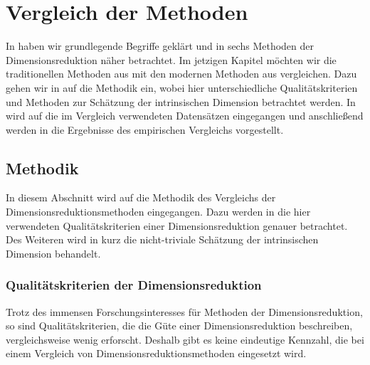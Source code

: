 \chapter{Vergleich der Methoden}
\label{ch:Vergleich}

In  haben wir grundlegende Begriffe geklärt und in
 sechs Methoden der Dimensionsreduktion näher betrachtet. Im jetzigen
Kapitel möchten wir die traditionellen Methoden aus  mit
den modernen Methoden aus  vergleichen. Dazu gehen wir in
 auf die Methodik ein, wobei hier unterschiedliche
Qualitätskriterien und Methoden zur Schätzung der intrinsischen Dimension betrachtet werden. In
 wird auf die im Vergleich verwendeten Datensätzen
eingegangen und anschließend werden in  die Ergebnisse des
empirischen Vergleichs vorgestellt.

\section{Methodik}
\label{ch:Vergleich:sec:Methodik}

In diesem Abschnitt wird auf die Methodik des Vergleichs der Dimensionsreduktionsmethoden
eingegangen. Dazu werden in  die
hier verwendeten Qualitätskriterien einer Dimensionsreduktion genauer betrachtet. Des Weiteren wird
in  kurz die
nicht-triviale Schätzung der intrinsischen Dimension behandelt. 
\subsection{Qualitätskriterien der Dimensionsreduktion}
\label{ch:Vergleich:sec:Methodik:subsec:Qualitaetskriterien}
Trotz des immensen Forschungsinteresses für Methoden der Dimensionsreduktion, so sind Qualitätskriterien, die die Güte einer Dimensionsreduktion beschreiben, vergleichsweise wenig erforscht. Deshalb gibt es keine eindeutige Kennzahl, die bei einem Vergleich von Dimensionsreduktionsmethoden eingesetzt wird.

